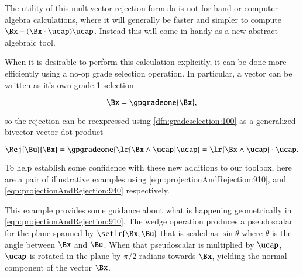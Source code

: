 The utility of this multivector rejection formula is not for hand or computer algebra calculations, where it will generally be faster and simpler to compute \( \Bx - (\Bx \cdot \ucap) \ucap \).  Instead this will come in handy as a new abstract algebraic tool.

When it is desirable to perform this calculation explicitly, it can be done more efficiently using a no-op grade selection operation.
In particular, a vector can be written as it's own grade-1 selection

\begin{dmath}\label{eqn:projectionAndRejection:920}
\Bx = \gpgradeone{ \Bx },
\end{dmath}

so the rejection can be reexpressed
using \cref{dfn:gradeselection:100}
as a generalized bivector-vector dot product

\begin{equation}\label{eqn:projectionAndRejection:940}
\Rej{\Bu}{\Bx}
= \gpgradeone{ \lr{ \Bx \wedge \ucap } \ucap }
= \lr{ \Bx \wedge \ucap } \cdot \ucap.
\end{equation}

To help establish some confidence with these new additions to our toolbox, here are a
pair of illustrative examples using
\cref{eqn:projectionAndRejection:910}, and
\cref{eqn:projectionAndRejection:940} respectively.


This example provides some guidance about what is happening geometrically in
\cref{eqn:projectionAndRejection:910}.
The wedge operation produces a pseudoscalar for the plane spanned by \( \setlr{\Bx, \Bu} \) that is scaled as \( \sin\theta \) where \( \theta \) is the angle between \( \Bx \) and \( \Bu \).  When that pseudoscalar is multiplied by \( \ucap \), \( \ucap \) is rotated in the plane by \( \pi/2 \) radians towards \( \Bx \), yielding the normal component of the vector \( \Bx \).

